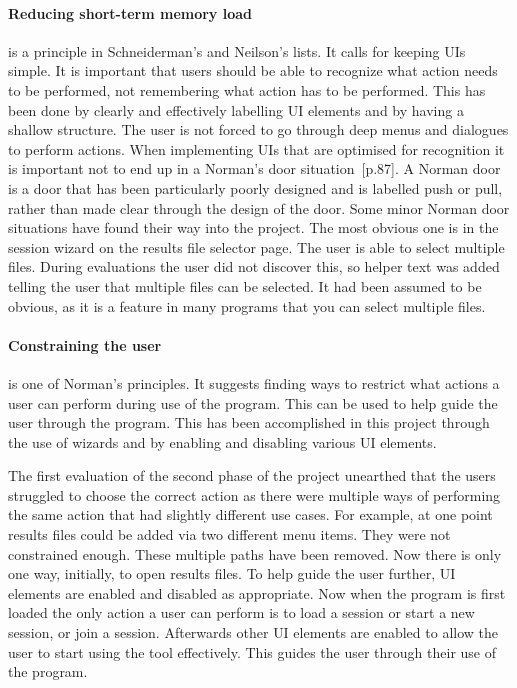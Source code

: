 \paragraph*{Reducing short-term memory load} is a principle in Schneiderman's and Neilson's lists.  It calls for keeping \acp{UI} simple.  It is important that users should be able to recognize what action needs to be performed, not remembering what action has to be performed.  This has been done by clearly and effectively labelling \ac{UI} elements and by having a shallow structure.  The user is not forced to go through deep menus and dialogues to perform actions.  When implementing \acp{UI} that are optimised for recognition it is important not to end up in a Norman's door situation~\cite{design_of_things}[p.87].  A Norman door is a door that has been particularly poorly designed and is labelled push or pull, rather than made clear through the design of the door.  Some minor Norman door situations have found their way into the project.  The most obvious one is in the session wizard on the results file selector page.  The user is able to select multiple files.  During evaluations the user did not discover this, so helper text was added telling the user that multiple files can be selected.  It had been assumed to be obvious, as it is a feature in many programs that you can select multiple files.

\paragraph*{Constraining the user} is one of Norman's principles.  It suggests finding ways to restrict what actions a user can perform during use of the program.  This can be used to help guide the user through the program.  This has been accomplished in this project through the use of wizards and by enabling and disabling various \ac{UI} elements.

The first evaluation of the second phase of the project unearthed that the users struggled to choose the correct action as there were multiple ways of performing the same action that had slightly different use cases.  For example, at one point results files could be added via two different menu items.  They were not constrained enough.  These multiple paths have been removed. Now there is only one way, initially, to open results files.  To help guide the user further, \ac{UI} elements are enabled and disabled as appropriate.  Now when the program is first loaded the only action a user can perform is to load a session or start a new session, or join a session.  Afterwards other \ac{UI} elements are enabled to allow the user to start using the tool effectively.  This guides the user through their use of the program.

